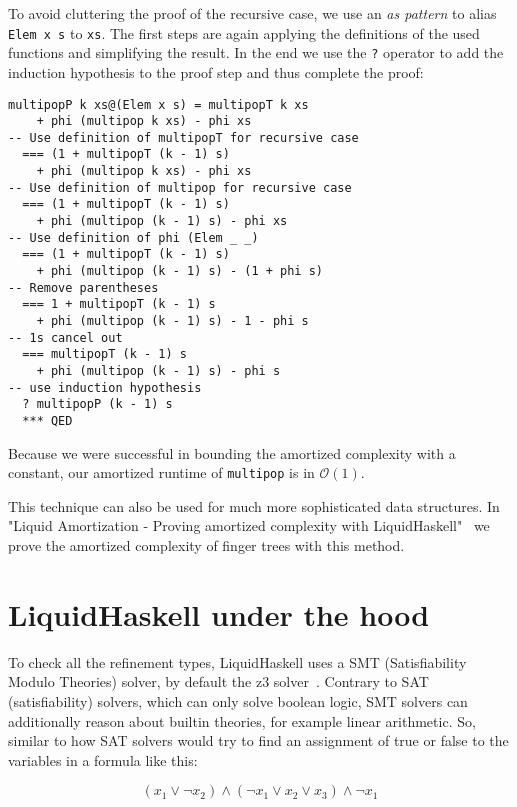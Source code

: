 \documentclass[acmlarge,screen,authorversion=true,nonacm=true]{acmart}
\renewcommand\O[1]{$\mathcal{O}(#1)$}
\begin{document}
To avoid cluttering the proof of the recursive case, we use an \textit{as pattern} to alias \texttt{Elem x s} to \texttt{xs}. The first steps are again applying the definitions of the used functions and simplifying the result. In the end we use the \texttt{?} operator to add the induction hypothesis to the proof step and thus complete the proof:

\begin{lstlisting}
multipopP k xs@(Elem x s) = multipopT k xs
    + phi (multipop k xs) - phi xs
-- Use definition of multipopT for recursive case
  === (1 + multipopT (k - 1) s)
    + phi (multipop k xs) - phi xs
-- Use definition of multipop for recursive case
  === (1 + multipopT (k - 1) s)
    + phi (multipop (k - 1) s) - phi xs
-- Use definition of phi (Elem _ _)
  === (1 + multipopT (k - 1) s)
    + phi (multipop (k - 1) s) - (1 + phi s)
-- Remove parentheses
  === 1 + multipopT (k - 1) s
    + phi (multipop (k - 1) s) - 1 - phi s
-- 1s cancel out
  === multipopT (k - 1) s
    + phi (multipop (k - 1) s) - phi s
-- use induction hypothesis
  ? multipopP (k - 1) s
  *** QED
\end{lstlisting}

Because we were successful in bounding the amortized complexity with a constant, our amortized runtime of \texttt{multipop} is in \O{1}.

This technique can also be used for much more sophisticated data structures. In "Liquid Amortization - Proving amortized complexity with LiquidHaskell"~\cite{amortized} we prove the amortized complexity of finger trees with this method.

\section{LiquidHaskell under the hood}\label{sec:hood}

To check all the refinement types, LiquidHaskell uses a SMT (Satisfiability Modulo Theories) solver, by default the z3 solver~\cite{z3}. Contrary to SAT (satisfiability) solvers, which can only solve boolean logic, SMT solvers can additionally reason about builtin theories, for example linear arithmetic. So, similar to how SAT solvers would try to find an assignment of true or false to the variables in a formula like this:

\begin{equation}
(x_1 \vee \neg x_2) \wedge (\neg x_1 \vee x_2 \vee x_3) \wedge \neg x_1
\end{equation}
\end{document}
